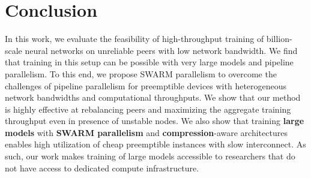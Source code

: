\section{Conclusion}

In this work, we evaluate the feasibility of high-throughput training of billion-scale neural networks on unreliable peers with low network bandwidth. 
We find that training in this setup can be possible with very large models and pipeline parallelism.
To this end, we propose SWARM parallelism to overcome the challenges of pipeline parallelism for preemptible devices with heterogeneous network bandwidths and computational throughputs. 
We show that our method is highly effective at rebalancing peers and maximizing the aggregate training throughput even in presence of unstable nodes.
We also show that training \textbf{large models} with \textbf{SWARM parallelism} and \textbf{compression}-aware architectures enables high utilization of cheap preemptible instances with slow interconnect. 
As such, our work makes training of large models accessible to researchers that do not have access to dedicated compute infrastructure.